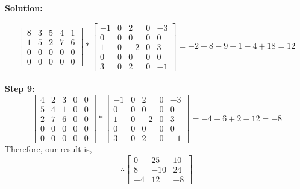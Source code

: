 \documentclass{article}
\newenvironment{solution}
  {\par\noindent\textbf{Solution:}\par}
  {\par}
\begin{document}
\begin{solution}
\[\begin{bmatrix}
8 & 3 & 5 & 4 & 1 \\
1 & 5 & 2 & 7 & 6  \\
0 & 0 & 0 & 0 & 0 \\
0 & 0 & 0 & 0 & 0 
\end{bmatrix} * \begin{bmatrix}
-1 & 0 & 2 & 0 & -3  \\
0 & 0 & 0 & 0 & 0 \\
1 & 0 & -2 & 0 & 3 \\
0 & 0 & 0 & 0 & 0 \\
3 & 0 & 2 & 0 & -1
\end{bmatrix} = -2+8-9+1-4+18 =12
\]
\\ 
\textbf{Step 9:}
\[
\begin{bmatrix}
4 & 2 & 3 & 0 & 0 \\
5 & 4 & 1 & 0 & 0 \\
2 & 7 & 6 & 0 & 0 \\
0 & 0 & 0 & 0 & 0 \\
0 & 0 & 0 & 0 & 0
\end{bmatrix}* \begin{bmatrix}
-1 & 0 & 2 & 0 & -3  \\
0 & 0 & 0 & 0 & 0 \\
1 & 0 & -2 & 0 & 3 \\
0 & 0 & 0 & 0 & 0 \\
3 & 0 & 2 & 0 & -1
\end{bmatrix} = -4 +6 + 2- 12 = -8
\]
Therefore, our result is,
\[ \therefore \begin{bmatrix}
  0 & 25 & 10 \\ 8 & -10 & 24 \\ -4 & 12 & -8
\end{bmatrix} \]
\end{solution}
\end{document}
